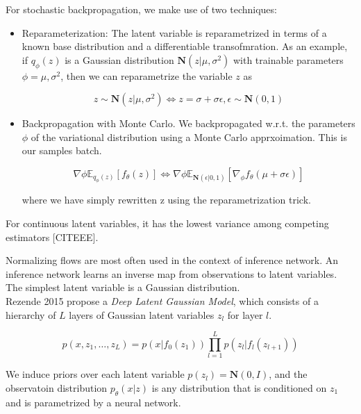 \documentclass[a4paper,12pt,twoside,openright]{report}
\begin{document}
For stochastic backpropagation, we make use of two techniques:

\begin{itemize}
\item Reparameterization: The latent variable is reparametrized in terms of a known base distribution and a differentiable transofmration.
As an example, if $q_\phi(z)$ is a Gaussian distribution $\mathbf{N}(z| \mu, \sigma^2)$ with trainable parameters $\phi = {\mu, \sigma^2}$, then we can reparametrize the variable $z$ as 

\begin{equation}
	z \sim \mathbf{N}(z | \mu, \sigma^2) \iff z = \sigma + \sigma \epsilon, \epsilon \sim \mathbf{N}(0, 1)
\end{equation}

\item Backpropagation with Monte Carlo. We backpropagated w.r.t. the parameters $\phi$ of the variational distribution using a Monte Carlo apprxoimation. 
This is our samples batch.

\begin{equation}
\nabla\phi \mathbb{E}_{q_\phi(z)}\left[ f_\theta(z) \right] 
\iff 
\nabla\phi \mathbb{E}_{\mathbf{N} (\epsilon | 0, 1)}\left[ \nabla_{\phi} f_\theta (\mu +  \sigma \epsilon) \right]
\end{equation}

where we have simply rewritten z using the reparametrization trick.

\end{itemize}

For continuous latent variables, it has the lowest variance among competing estimators [CITEEE].

Normalizing flows are most often used in the context of inference network. 
An inference network learns an inverse map from observations to latent variables.
The simplest latent variable is a Gaussian distribution. \\

Rezende 2015 propose a \textit{Deep Latent Gaussian Model}, which consists of a hierarchy of $L$ layers of Gaussian latent variables $z_l$ for layer $l$.

\begin{equation}
p(x, z_1, \ldots, z_L) = p(x | f_0(z_1)) \prod_{l=1}^{L} p(z_l | f_l(z_{l+1}))
\end{equation}

We induce priors over each latent variable $p(z_l) = \mathbf{N}(0, I)$, and the observatoin distribution $p_\theta(x|z)$ is any distribution that is conditioned on $z_1$ and is parametrized by a neural network. \\
\end{document}
